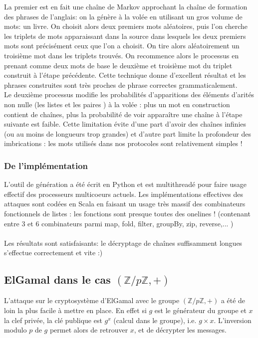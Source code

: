 \documentclass[11pt]{article} %
\begin{document}
    La premier est en fait une chaîne de Markov approchant la chaîne de formation des phrases de l'anglais: on la génère à la volée en utilisant un gros volume de mots: un livre. On choisit alors deux premiers mots aléatoires, puis l'on cherche les triplets de mots apparaissant dans la source dans lesquels les deux premiers mots sont précisément ceux que l'on a choisit. On tire alors aléatoirement un troisième mot dans les triplets trouvés. On recommence alors le processus en prenant comme deux mots de base le deuxième et troisième mot du triplet construit à l'étape précédente. Cette technique donne d'excellent résultat et les phrases construites sont très proches de phrase correctes grammaticalement. \\

    Le deuxième processus modifie les probabilités d'apparitions des éléments d'arités non nulle (les listes et les paires ) à la volée : plus un mot en construction contient de chaînes, plus la probabilité de voir apparaître une chaîne à l'étape suivante est faible.  Cette limitation évite d'une part d'avoir des chaînes infinies (ou au moins de longueurs trop grandes) et d'autre part limite la profondeur des imbrications : les mots utilisés dans nos protocoles sont relativement simples !


  \subsubsection{De l'implémentation}

  L'outil de génération a été écrit en Python et est multithreadé pour faire usage effectif des processeurs multicoeurs actuels. Les implémentations effectives des attaques sont codées en Scala en faisant un usage très massif des combinateurs fonctionnels de listes : les fonctions sont presque toutes des onelines ! (contenant entre 3 et 6 combinateurs parmi map, fold, filter, groupBy, zip, reverse,... )\\\\

  Les résultats sont satisfaisants: le décryptage de chaînes suffisamment longues s'effectue correctement et vite :)

\subsection{ElGamal dans le cas $(\mathbb{Z}/p\mathbb{Z}, +)$}

L'attaque sur le cryptosystème d'ElGamal avec le groupe $(\mathbb{Z}/p\mathbb{Z}, +)$ a été de loin la plus facile à mettre en place. En effet si $g$ est le générateur du groupe et $x$ la clef privée, la clé publique est $g^x$ (calcul dans le groupe), i.e. $g\times x$. L'inversion modulo $p$ de $g$ permet alors de retrouver $x$, et de décrypter les messages.
\end{document}
